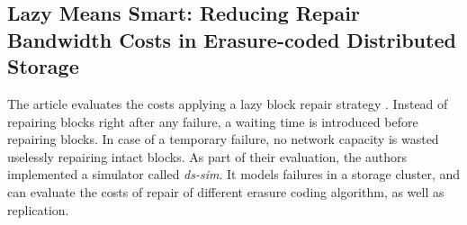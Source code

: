 \subsection{Lazy Means Smart: Reducing Repair Bandwidth Costs in Erasure-coded Distributed Storage}

The article evaluates the costs applying a lazy block repair strategy \autocite{Silberstein2014}.
Instead of repairing blocks right after any failure, a waiting time is introduced before repairing blocks.
In case of a temporary failure, no network capacity is wasted uselessly repairing intact blocks.
As part of their evaluation, the authors implemented a simulator called \textit{ds-sim}.
It models failures in a storage cluster, and can evaluate the costs of repair of different erasure coding algorithm, as well as replication.
